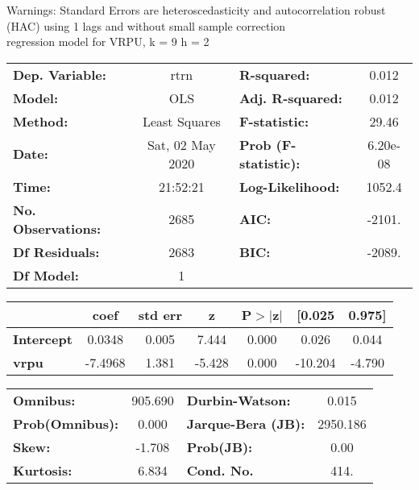 Warnings: \newline
 [1] Standard Errors are heteroscedasticity and autocorrelation robust (HAC) using 1 lags and without small sample correction\\ 

regression model for VRPU, k = 9 h = 2\begin{center}
\begin{tabular}{lclc}
\toprule
\textbf{Dep. Variable:}    &       rtrn       & \textbf{  R-squared:         } &     0.012   \\
\textbf{Model:}            &       OLS        & \textbf{  Adj. R-squared:    } &     0.012   \\
\textbf{Method:}           &  Least Squares   & \textbf{  F-statistic:       } &     29.46   \\
\textbf{Date:}             & Sat, 02 May 2020 & \textbf{  Prob (F-statistic):} &  6.20e-08   \\
\textbf{Time:}             &     21:52:21     & \textbf{  Log-Likelihood:    } &    1052.4   \\
\textbf{No. Observations:} &        2685      & \textbf{  AIC:               } &    -2101.   \\
\textbf{Df Residuals:}     &        2683      & \textbf{  BIC:               } &    -2089.   \\
\textbf{Df Model:}         &           1      & \textbf{                     } &             \\
\bottomrule
\end{tabular}
\begin{tabular}{lcccccc}
                   & \textbf{coef} & \textbf{std err} & \textbf{z} & \textbf{P$> |$z$|$} & \textbf{[0.025} & \textbf{0.975]}  \\
\midrule
\textbf{Intercept} &       0.0348  &        0.005     &     7.444  &         0.000        &        0.026    &        0.044     \\
\textbf{vrpu}      &      -7.4968  &        1.381     &    -5.428  &         0.000        &      -10.204    &       -4.790     \\
\bottomrule
\end{tabular}
\begin{tabular}{lclc}
\textbf{Omnibus:}       & 905.690 & \textbf{  Durbin-Watson:     } &    0.015  \\
\textbf{Prob(Omnibus):} &   0.000 & \textbf{  Jarque-Bera (JB):  } & 2950.186  \\
\textbf{Skew:}          &  -1.708 & \textbf{  Prob(JB):          } &     0.00  \\
\textbf{Kurtosis:}      &   6.834 & \textbf{  Cond. No.          } &     414.  \\
\bottomrule
\end{tabular}
\end{center}


